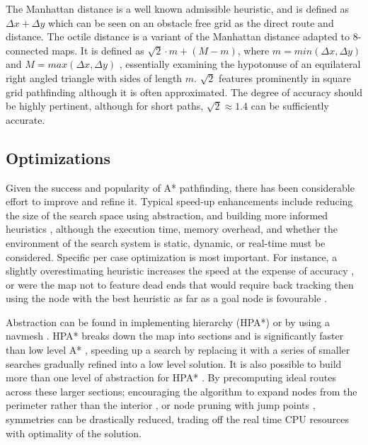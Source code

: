 \documentclass{scrartcl}
\begin{document}
The Manhattan distance is a well known admissible heuristic, and is defined as $\Delta x + \Delta y$ \cite{botea2013pathfinding} which can be seen on an obstacle free grid as the direct route and distance.  The octile distance is a variant of the Manhattan distance adapted to 8-connected maps. It is defined as $\sqrt{2} \cdot m + (M - m)$, where $m = min(\Delta x, \Delta y)$ and $M = max(\Delta x, \Delta y)$ \cite{botea2013pathfinding}, essentially examining the hypotonuse of an equilateral right angled triangle with sides of length $m$.  $\sqrt{2}$ features prominently in square grid pathfinding although it is often approximated.  The degree of accuracy should be highly pertinent, although for short paths, $\sqrt{2} \approx 1.4$ can be sufficiently accurate.

\subsection*{Optimizations}

Given the success and popularity of A* pathfinding, there has been considerable effort to improve and refine it.  Typical speed-up enhancements include reducing the size of the search space using abstraction, and building more informed heuristics \cite{harabor2010breaking}, although the execution time, memory overhead, and whether the environment of the search system is static, dynamic, or real-time \cite{hart1968formal} must be considered.  Specific per case optimization is most important. For instance, a slightly overestimating heuristic increases the speed at the expense of accuracy \cite{millington2016artificial}, or were the map not to feature dead ends that would require back tracking then using the node with the best heuristic as far as a goal node is fovourable \cite{togelius20102009}.

Abstraction can be found in implementing hierarchy (HPA*) or by using a navmesh \cite{cui2011based}.  HPA* breaks down the map into sections and is significantly faster than low level A* \cite{botea2004near}, speeding up a search by replacing it with a series of smaller searches \cite{botea2013pathfinding} gradually refined into a low level solution.  It is also possible to build more than one level of abstraction for HPA* \cite {jansen2007hpa}. By precomputing ideal routes across these larger sections; encouraging the algorithm to expand nodes from the perimeter rather than the interior \cite{harabor2012fast}, or node pruning with jump points \cite{harabor2011online}, symmetries can be drastically reduced, trading off the real time CPU resources with optimality of the solution. 
\end{document}
